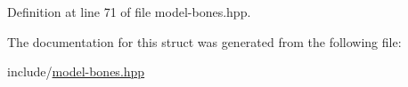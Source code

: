 Definition at line 71 of file model-\/bones.\+hpp.



The documentation for this struct was generated from the following file\+:\begin{DoxyCompactItemize}
\item 
include/\hyperlink{model-bones_8hpp}{model-\/bones.\+hpp}\end{DoxyCompactItemize}
